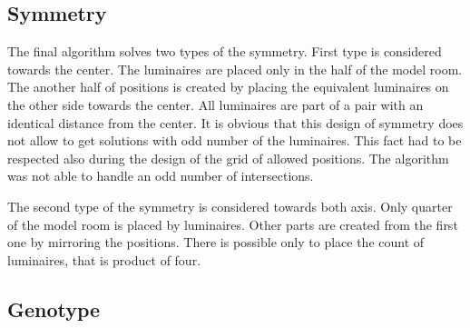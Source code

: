 \subsection{Symmetry}
The final algorithm solves two types of the symmetry. First type is considered towards the center. The luminaires are placed only in the half of the model room. The another half of positions is created by placing the equivalent luminaires on the other side towards the center. All luminaires are part of a pair with an identical distance from the center. It is obvious that this design of symmetry does not allow to get solutions with odd number of the luminaires. This fact had to be respected also during the design of the grid of allowed positions. The algorithm was not able to handle an odd number of intersections.

The second type of the symmetry is considered towards both axis. Only quarter of the model room is placed by luminaires. Other parts are created from the first one by mirroring the positions. There is possible only to place the count of luminaires, that is product of four.

\subsection{Genotype}
